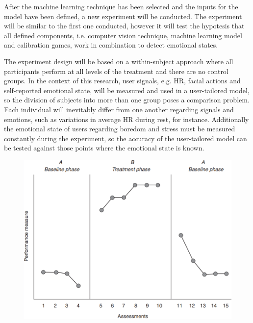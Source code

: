 After the machine learning technique has been selected and the inputs for the model have been defined, a new experiment will be conducted. The experiment will be similar to the first one conducted, however it will test the hypotesis that all defined components, i.e. computer vision technique, machine learning model and calibration games, work in combination to detect emotional states.

The experiment design will be based on a within-subject approach \cite{lane2015online} where all participants perform at all levels of the treatment and there are no control groups. In the context of this research, user signals, e.g. HR, facial actions and self-reported emotional state, will be measured and used in a user-tailored model, so the division of subjects into more than one group poses a comparison problem. Each individual will inevitably differ from one another regarding signals and emotions, such as variations in average HR during rest, for instance. Additionally the emotional state of users regarding boredom and stress must be measured constantly during the experiment, so the accuracy of the user-tailored model can be tested against those points where the emotional state is known.

\begin{figure}[ht]
    \centering
    \includegraphics[scale=0.5]{figures/time-series-design-breakwell.png}
    \caption{\textcite{breakwell1994research}}
    \label{fig:time-series-design-breakwell}
\end{figure}

